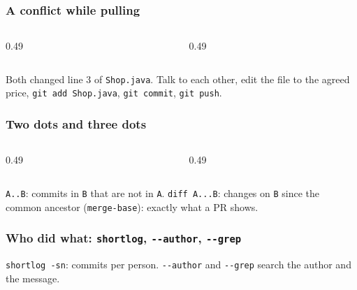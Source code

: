 \documentclass[aspectratio=169,10pt,compress]{beamer}
\begin{document}
\begin{frame}[t,fragile] \frametitle{A conflict while pulling}
  \begin{columns}[T]
    \begin{column}{0.49\textwidth}
    \end{column}
    \begin{column}{0.49\textwidth}
    \end{column}
  \end{columns}

  \vspace{0.1em}
  \small
  Both changed line 3 of \texttt{Shop.java}. Talk to each other, edit the file to the agreed price, \texttt{git add Shop.java}, \texttt{git commit}, \texttt{git push}.
\end{frame}





\begin{frame}[t,fragile] \frametitle{Two dots and three dots}
  \begin{columns}[T]
    \begin{column}{0.49\textwidth}
    \end{column}
    \begin{column}{0.49\textwidth}
    \end{column}
  \end{columns}

  \vspace{0.1em}
  \small
  \texttt{A..B}: commits in \texttt{B} that are not in \texttt{A}. \texttt{diff A...B}: changes on \texttt{B} since the common ancestor (\texttt{merge-base}): exactly what a PR shows.
\end{frame}




\begin{frame}[t,fragile] \frametitle{Who did what: \texttt{shortlog}, \texttt{-{}-author}, \texttt{-{}-grep}}

  \vspace{0.1em}
  \small
  \texttt{shortlog -sn}: commits per person. \texttt{-{}-author} and \texttt{-{}-grep} search the author and the message.
\end{frame}
\end{document}
